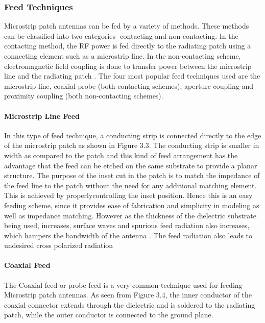 \documentclass[12pt]{article}
\begin{document}
				                \subsubsection{Feed Techniques}
				                  \justify
				                   Microstrip patch antennas can be fed by a variety of methods. These methods can be
				                   classified into two categories- contacting and non-contacting. In the contacting method, the RF power is fed directly to the radiating patch using a connecting element such as a microstrip line. In the non-contacting scheme, electromagnetic field coupling is done to transfer power between the microstrip line and the radiating patch . The four most popular feed techniques used are the microstrip line, coaxial probe (both contacting schemes), aperture coupling and proximity coupling (both non-contacting schemes).
				                   \paragraph{ Microstrip Line Feed}
				                    \justify
				                     In this type of feed technique, a conducting strip is connected directly to the edge of the microstrip patch as shown in Figure 3.3. The conducting strip is smaller in width as compared to the patch and this kind of feed arrangement has the advantage that the feed can be etched on the same substrate to provide a planar structure.
					               	The purpose of the inset cut in the patch is to match the impedance of the feed line to the patch without the need for any additional matching element. This is achieved by properlycontrolling the inset position. Hence this is an easy feeding scheme, since it provides ease of fabrication and simplicity in modeling as well as impedance matching. However as the thickness of the dielectric substrate being used, increases, surface waves and spurious feed radiation also increases, which hampers the bandwidth of the antenna . The feed radiation also leads to undesired cross polarized radiation
					               \paragraph{ Coaxial Feed}
					                \justify
					                
					                
					                  The Coaxial feed or probe feed is a very common technique used for feeding Microstrip patch antennas. As seen from Figure 3.4, the inner conductor of the coaxial connector extends through the dielectric and is soldered to the radiating patch, while the outer conductor is connected to the ground plane.
					                  
\end{document}
